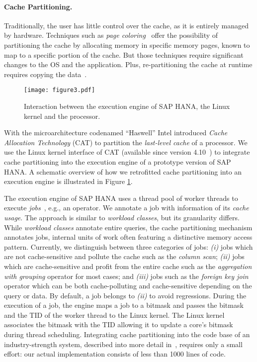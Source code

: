 \documentclass[11pt]{article}
\begin{document}
\paragraph*{Cache Partitioning.}
Traditionally, the user has little control over the cache, as it is entirely managed by hardware.
Techniques such as \emph{page coloring}~\cite{nollhrm19:Lee:2009:MMC:1687627.1687670} offer the possibility of partitioning the cache by allocating memory in specific memory pages, known to map to a specific portion of the cache.
But those techniques require significant changes to the OS and the application.
Plus, re-partitioning the cache at runtime requires copying the data~\cite{nollhrm19:4658653, nollhrm19:Zhang:2009:TPP:1519065.1519076}.

\begin{figure}
\centering
\texttt{[image: figure3.pdf]}
\caption{Interaction between the execution engine of SAP HANA, the Linux kernel and the processor.}
\label{nollhrm19:fig:hana_cat}
\end{figure}

With the microarchitecture codenamed ``Haswell'' Intel introduced \emph{Cache Allocation Technology} (CAT) \cite{nollhrm19:Intel:2015:CAT:whitepaper} to partition the \emph{last-level cache} of a processor.
We use the Linux kernel interface of CAT (available since version 4.10~\cite{nollhrm19:Intel:2017:CAT:Kernel}) to integrate cache partitioning into the execution engine of a prototype version of SAP HANA\@.
A schematic overview of how we retrofitted cache partitioning into an execution engine is illustrated in Figure \ref{nollhrm19:fig:hana_cat}.

The execution engine of SAP HANA uses a thread pool of worker threads to execute \emph{jobs}~\cite{nollhrm19:Psaroudakis:2015:SUC:2824032.2824043}, e.g., an operator.
We annotate a job with information of its \emph{cache usage}.
The approach is similar to \emph{workload classes}, but its granularity differs.
While \emph{workload classes} annotate entire queries, the cache partitioning mechanism annotates jobs, internal units of work often featuring a distinctive memory access pattern.
Currently, we distinguish between three categories of jobs:
\textit{(i)} jobs which are not cache-sensitive and pollute the cache such as the \emph{column scan};
\textit{(ii)} jobs which are cache-sensitive and profit from the entire cache such as the \emph{aggregation with grouping} operator for most cases; and
\textit{(iii)} jobs such as the \emph{foreign key join} operator which can be both cache-polluting and cache-sensitive depending on the query or data.
By default, a job belongs to \textit{(ii)} to avoid regressions.
During the execution of a job, the engine maps a job to a bitmask and passes the bitmask and the TID of the worker thread to the Linux kernel.
The Linux kernel associates the bitmask with the TID allowing it to update a core's bitmask during thread scheduling.
Integrating cache partitioning into the code base of an industry-strength system, described into more detail in~\cite{nollhrm19:Noll:2018}, requires only a small effort: our actual implementation consists of less than 1000 lines of code.
\end{document}

